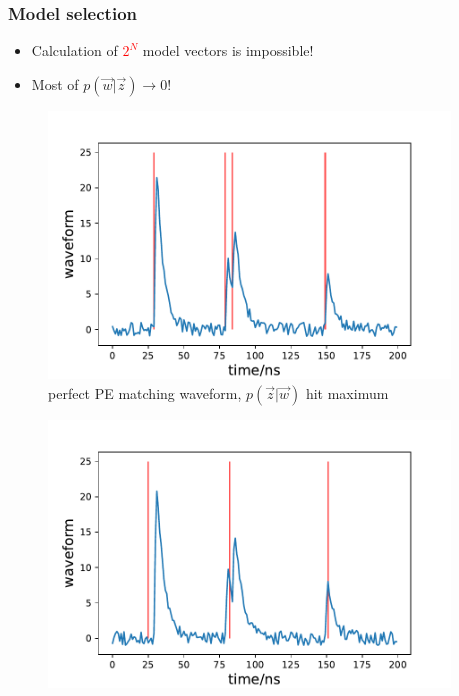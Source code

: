 \documentclass{beamer}
\begin{document}
\begin{CJK*}{UTF8}{gbsn}
\begin{frame}
\frametitle{Model selection}
\begin{itemize}
    \item Calculation of \textcolor{red}{$2^{N}$} model vectors is impossible!
    \item Most of $p(\vec{w}|\vec{z}) \rightarrow 0$!
\end{itemize}
\noindent\begin{minipage}[c]{0.33\textwidth}
    \begin{figure}[H]
        \centering
            \includegraphics[width=0.95\textwidth]{img/perfect_PE.pdf}
        \caption{perfect PE matching waveform, $p(\vec{z}|\vec{w})$ hit maximum}
        \label{fig:perfect PE}
    \end{figure}
\end{minipage}\begin{minipage}[c]{0.33\textwidth}
    \begin{figure}[H]
        \centering
            \includegraphics[width=0.95\textwidth]{img/not_so_perfect_PE.pdf}

\end{figure}
\end{minipage}
\end{frame}
\end{CJK*}
\end{document}
